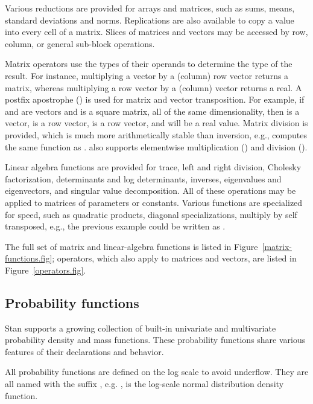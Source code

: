 \documentclass[article]{jss}
\begin{document}
Various reductions are provided for arrays and matrices, such as sums,
means, standard deviations and norms.  Replications are also available
to copy a value into every cell of a matrix.  Slices of matrices and
vectors may be accessed by row, column, or general sub-block
operations.

Matrix operators use the types of their operands to determine the type
of the result.  For instance, multiplying a vector by a (column) row
vector returns a matrix, whereas multiplying a row vector by a
(column) vector returns a real.  A postfix apostrophe () is
used for matrix and vector transposition.  For example, if 
and  are vectors and  is a square matrix, all of
the same dimensionality, then  is a vector,  is a row vector,  is a row vector, and
 will be a real value.  Matrix
division is provided, which is much more arithmetically stable than
inversion, e.g.,  computes the same function
as .   also supports
elementwise multiplication () and division ().

Linear algebra functions are provided for trace, left and right
division, Cholesky factorization, determinants and log determinants,
inverses, eigenvalues and eigenvectors, and singular value
decomposition.  All of these operations may be applied to matrices of
parameters or constants.  Various functions are specialized for speed,
such as quadratic products, diagonal specializations, multiply by self
transposed, e.g., the previous example could be written as
.

The full set of matrix and linear-algebra functions is listed in
Figure~\ref{matrix-functions.fig}; operators, which also apply to
matrices and vectors, are listed in Figure~\ref{operators.fig}.

\subsection{Probability functions}

Stan supports a growing collection of built-in univariate and
multivariate probability density and mass functions.  These
probability functions share various features of their declarations and
behavior.

All probability functions are defined on the log scale to avoid
underflow.  They are all named with the suffix , e.g.
, is the log-scale normal distribution density
function.
\end{document}
